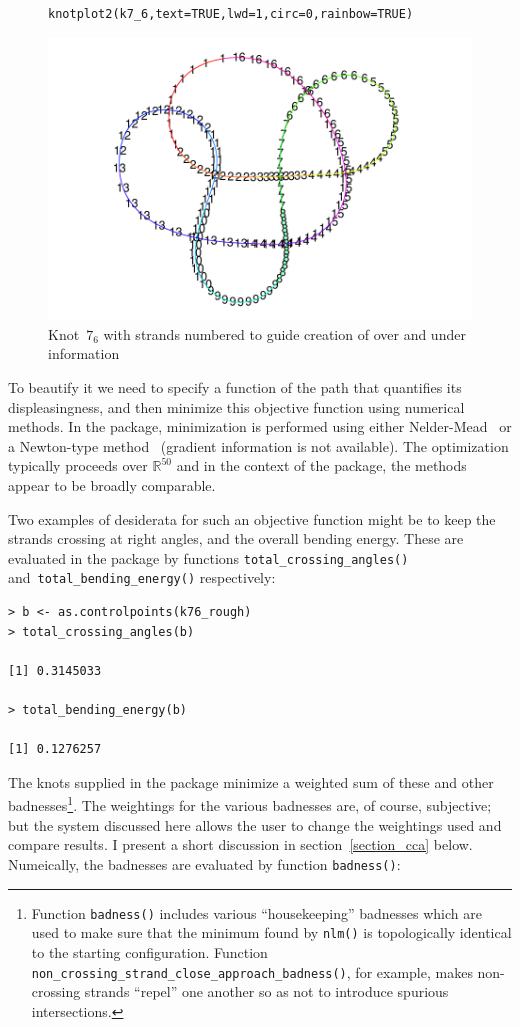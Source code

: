 \documentclass{birkjour}
\theoremstyle{definition}
\theoremstyle{remark}
\numberwithin{equation}{section}
\begin{document}
\begin{figure}[!tbp]
\begin{verbatim}
knotplot2(k7_6,text=TRUE,lwd=1,circ=0,rainbow=TRUE)
\end{verbatim}
 \centering
\includegraphics[scale = 0.9]{knot-004}
\caption{Knot~$7_6$ with strands numbered \label{k76_strands} to guide
creation of over and under information} \end{figure}

To beautify it we need to specify a function of the path that
quantifies its displeasingness, and then minimize this objective
function using numerical methods.  In the package, minimization is
performed using either Nelder-Mead~\cite{nelder1965} or a Newton-type
method~\cite{dennis1983} (gradient information is not available).  The
optimization typically proceeds over $\mathbb{R}^{50}$ and in the
context of the package, the methods appear to be broadly comparable.

Two examples of desiderata for such an objective function might be to
keep the strands crossing at right angles, and the overall bending
energy.  These are evaluated in the package by functions
{\tt total\_crossing\_angles()} and~{\tt total\_bending\_energy()}
respectively:

\begin{verbatim}
> b <- as.controlpoints(k76_rough)
> total_crossing_angles(b)

[1] 0.3145033

> total_bending_energy(b)

[1] 0.1276257
\end{verbatim}

The knots supplied in the package minimize a weighted sum of these and
other badnesses\footnote{Function {\tt badness()} includes various
``housekeeping'' badnesses which are used to make sure that the
minimum found by {\tt nlm()} is topologically identical to the
starting configuration.  Function {\tt
  non\_crossing\_strand\_close\_approach\_badness()}, for example,
makes non-crossing strands ``repel'' one another so as not to
introduce spurious intersections.}.  The weightings for the various
badnesses are, of course, subjective; but the system discussed here
allows the user to change the weightings used and compare results.  I
present a short discussion in section~\ref{section_cca} below.
Numeically, the badnesses are evaluated by function {\tt badness()}:
\end{document}
